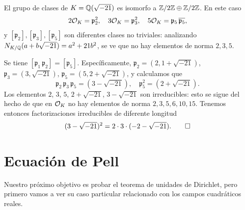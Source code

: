 \begin{ejemplo}
  El grupo de clases de $K = \mathbb{Q} (\sqrt{-21})$ es isomorfo a
  $\mathbb{Z}/2\mathbb{Z} \oplus \mathbb{Z}/2\mathbb{Z}$. En este caso
  \[ 2\mathcal{O}_K = \mathfrak{p}_2^2, \quad
     3\mathcal{O}_K = \mathfrak{p}_3^2, \quad
     5\mathcal{O}_K = \mathfrak{p}_5 \, \overline{\mathfrak{p}_5}, \]
  y $[\mathfrak{p}_2], [\mathfrak{p}_3], [\mathfrak{p}_5]$ son diferentes clases
  no triviales: analizando $N_{K/\mathbb{Q}} (a + b\sqrt{-21}) = a^2 + 21 b^2$,
  se ve que no hay elementos de norma $2,3,5$.

  Se tiene $[\mathfrak{p}_1\,\mathfrak{p}_2] = [\mathfrak{p}_5]$.
  Específicamente,
  $\mathfrak{p}_2 = (2, 1 + \sqrt{-21})$,
  $\mathfrak{p}_3 = (3, \sqrt{-21})$,
  $\mathfrak{p}_5 = (5, 2 + \sqrt{-21})$, y calculamos que
  \[ \mathfrak{p}_2\,\mathfrak{p}_3\,\mathfrak{p}_5 = (3 - \sqrt{-21}), \quad
     \mathfrak{p}_5^2 = (2 + \sqrt{-21}). \]
  Los elementos $2$, $3$, $5$, $2 + \sqrt{-21}$, $3 - \sqrt{-21}$
  son irreducibles: esto se sigue del hecho de que en $\mathcal{O}_K$ no hay elementos de
  norma $2, 3, 5, 6, 10, 15$. Tenemos entonces factorizaciones irreducibles de
  diferente longitud
  \[ (3 - \sqrt{-21})^2 = 2\cdot 3\cdot (-2 - \sqrt{-21}). \qedhere \]
\end{ejemplo}


\section{Ecuación de Pell}

Nuestro próximo objetivo es probar el teorema de unidades de Dirichlet, pero
primero vamos a ver su caso particular relacionado con los campos cuadráticos
reales.

